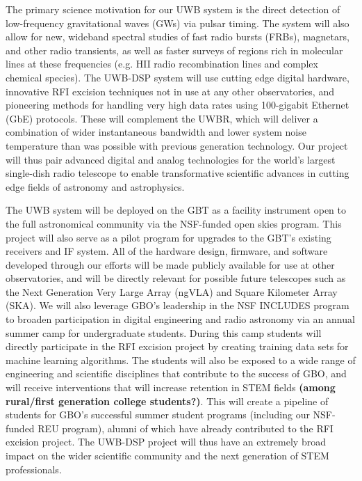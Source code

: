 \documentclass[10pt]{myNSF}
\begin{document}
The primary science motivation for our UWB system is the direct
detection of low-frequency gravitational waves (GWs) via pulsar
timing.  The system will also allow for new, wideband spectral studies
of fast radio bursts (FRBs), magnetars, and other radio transients, as
well as faster surveys of regions rich in molecular lines at these
frequencies (e.g. H{\sc II} radio recombination lines and complex
chemical species).  The UWB-DSP system will use cutting edge digital
hardware, innovative RFI excision techniques not in use at any other
observatories, and pioneering methods for handling very high data
rates using 100-gigabit Ethernet (GbE) protocols.  These will
complement the UWBR, which will deliver a combination of wider
instantaneous bandwidth and lower system noise temperature than was
possible with previous generation technology.  Our project will thus
pair advanced digital and analog technologies for the world's largest
single-dish radio telescope to enable transformative scientific
advances in cutting edge fields of astronomy and astrophysics.

The UWB system will be deployed on the GBT as a facility instrument
open to the full astronomical community via the NSF-funded open skies
program.  This project will also serve as a pilot program for upgrades
to the GBT's existing receivers and IF system.  All of the hardware
design, firmware, and software developed through our efforts will be
made publicly available for use at other observatories, and will be
directly relevant for possible future telescopes such as the Next
Generation Very Large Array (ngVLA) and Square Kilometer Array (SKA).
We will also leverage GBO's leadership in the NSF INCLUDES program to
broaden participation in digital engineering and radio astronomy via
an annual summer camp for undergraduate students.  During this camp
students will directly participate in the RFI excision project by
creating training data sets for machine learning algorithms.  The
students will also be exposed to a wide range of engineering and
scientific disciplines that contribute to the success of GBO, and will
receive interventions that will increase retention in STEM fields
\textbf{(among rural/first generation college students?)}.  This will
create a pipeline of students for GBO's successful summer student
programs (including our NSF-funded REU program), alumni of which have
already contributed to the RFI excision project.  The UWB-DSP project
will thus have an extremely broad impact on the wider scientific
community and the next generation of STEM professionals.
\end{document}
